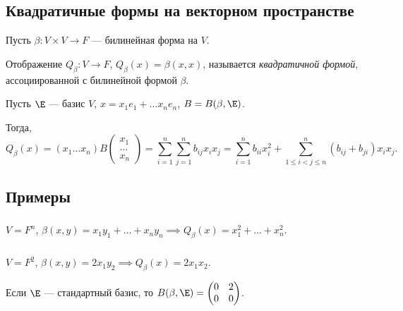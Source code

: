 \begin{comment}
    Базис $\E'$ в котором $B(\beta, \E')$ имеет диагональный вид определен неоднозначно.
\end{comment}


\subsection{Квадратичные формы на векторном пространстве}

Пусть $\beta \colon V \times V \to F$ --- билинейная форма на $V$.


\begin{definition}
    Отображение $Q_\beta \colon V \to F$, $Q_\beta(x) = \beta(x, x)$, называется \textit{квадратичной формой}, ассоциированной с билинейной формой $\beta$.
\end{definition}

Пусть $\E$ --- базис $V$, $x = x_1 e_1 + \dots x_n e_n$, $B = B(\beta, \E)$.

Тогда,
\begin{equation*}
    Q_\beta(x) = (x_1 \dots x_n) B \begin{pmatrix} x_1 \\ \dots \\ x_n \end{pmatrix} = \sum_{i = 1}^{n} \sum_{j = 1}^{n} b_{ij} x_i x_j = \sum_{i = 1}^{n} b_{ii} x_i^2 + \sum_{1 \leq i < j \leq n}^{n} (b_{ij} + b_{ji}) x_i x_j
.\end{equation*}


\subsection{Примеры}

\subsubsection{}

$V = F^n$, $\beta(x, y) = x_1 y_1 + \dots + x_n y_n \implies Q_\beta(x) = x_1^2 + \dots + x_n^2$.

\subsubsection{}

$V = F^2$, $\beta(x, y) = 2x_1 y_2 \implies Q_\beta(x) = 2x_1 x_2$.

Если $\E$ --- стандартный базис, то $B(\beta, \E) = \begin{pmatrix} 0 & 2 \\ 0 & 0 \end{pmatrix}$.

